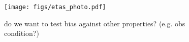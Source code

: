 \begin{figure}
\begin{center}
    \texttt{[image: figs/etas\_photo.pdf]}
    \caption{do we want to test bias against other properties? (e.g. obs condition?)} 
    \label{fig:systematics}
\end{center}
\end{figure}




